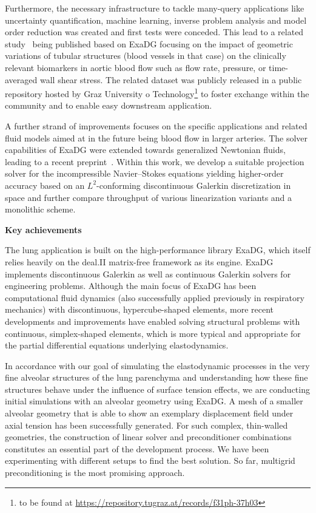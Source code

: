 \documentclass[a4paper,12pt, numbers]{article}
\begin{document}
Furthermore, the necessary infrastructure to tackle many-query applications like uncertainty quantification, machine learning, inverse problem analysis and model order reduction was created and first tests were conceded. This lead to a related study~\citep{bosnjak2025Synthaorta} being published based on ExaDG focusing on the impact of geometric variations of tubular structures (blood vessels in that case) on the clinically relevant biomarkers in aortic blood flow such as flow rate, pressure, or time-averaged wall shear stress. The related dataset was publicly released in a public repository hosted by Graz University o Technology\footnote{to be found at \href{https://repository.tugraz.at/records/f31ph-37h03}{https://repository.tugraz.at/records/f31ph-37h03}} to foster exchange within the community and to enable easy downstream application.

A further strand of improvements focuses on the specific applications and related fluid models aimed at in the future being blood flow in larger arteries. The solver capabilities of ExaDG were extended towards generalized Newtonian fluids, leading to a recent preprint~\citep{schussnig2025genNewtonian}. Within this work, we develop a suitable projection solver for the incompressible Navier--Stokes equations yielding higher-order accuracy based on an $L^2$-conforming discontinuous Galerkin discretization in space and further compare throughput of various linearization variants and a monolithic scheme.

\noindent\textbf{Key achievements}

The lung application is built on the high-performance library ExaDG, which itself relies heavily on the deal.II matrix-free framework as its engine. ExaDG implements discontinuous Galerkin as well as continuous Galerkin solvers for engineering problems. Although the main focus of ExaDG has been computational fluid dynamics (also successfully applied previously in respiratory mechanics) with discontinuous, hypercube-shaped elements, more recent developments and improvements \citep{schussnig2025matrixfree} have enabled solving structural problems with continuous, simplex-shaped elements, which is more typical and appropriate for the partial differential equations underlying elastodynamics.

In accordance with our goal of simulating the elastodynamic processes in the very fine alveolar structures of the lung parenchyma and understanding how these fine structures behave under the influence of surface tension effects, we are conducting initial simulations with an alveolar geometry using ExaDG. A mesh of a smaller alveolar geometry that is able to show an exemplary displacement field under axial tension has been successfully generated. For such complex, thin-walled geometries, the construction of linear solver and preconditioner combinations constitutes an essential part of the development process. We have been experimenting with different setups to find the best solution. So far, multigrid preconditioning is the most promising approach.
\end{document}
